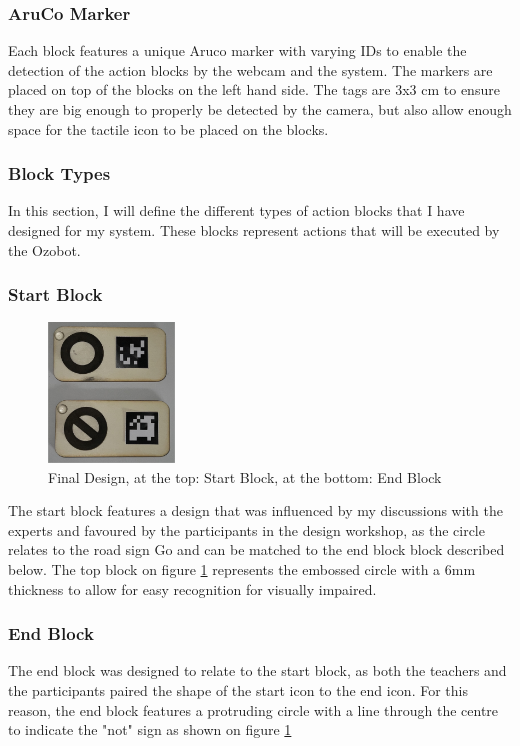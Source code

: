 \documentclass[oneside,%
                    author={Malak Hajji},
                    degree={BSc},
                    title={Designing An Accessible Computational Toolkit For Students},
                  subtitle={With Mixed Visual Abilities}]{dissertation}
\begin{document}
\subsubsection{AruCo Marker}
Each block features a unique Aruco marker with varying IDs to enable the detection of the action blocks by the webcam and the system. The markers are placed on top of the blocks on the left hand side. The tags are 3x3 cm to ensure they are big enough to properly be detected by the camera, but also allow enough space for the tactile icon to be placed on the blocks.
\subsubsection{Block Types}
In this section, I will define the different types of action blocks that I have designed for my system. These blocks represent actions that will be executed by the Ozobot.
\subsubsection{Start Block}
\FloatBarrier
\begin{figure}[h]
    \centering
    \includegraphics[width=0.3\textwidth]{thesis/startandend.eps}
    \caption{Final Design, at the top: Start Block, at the bottom: End Block}
    \label{fig-startandend}
\end{figure}
\FloatBarrier
The start block features a design that was influenced by my discussions with the experts and favoured by the participants in the design workshop, as the circle relates to the road sign Go and can be matched to the end block block described below. The top block on figure \ref{fig-startandend} represents the embossed circle with a 6mm thickness to allow for easy recognition for visually impaired. 

\subsubsection{End Block}
The end block was designed to relate to the start block, as both the teachers and the participants paired the shape of the start icon to the end icon. For this reason, the end block features a protruding circle with a line through the centre to indicate the "not" sign as shown on figure \ref{fig-startandend}
\end{document}
